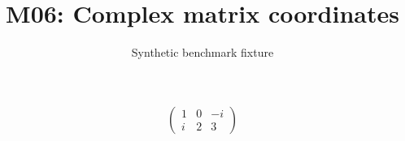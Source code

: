 \documentclass{article}
\title{M06: Complex matrix coordinates}
\author{Synthetic benchmark fixture}
\date{}
\begin{document}
\maketitle
\[\begin{pmatrix}1&0&-i\\i&2&3\end{pmatrix}\]
\end{document}
